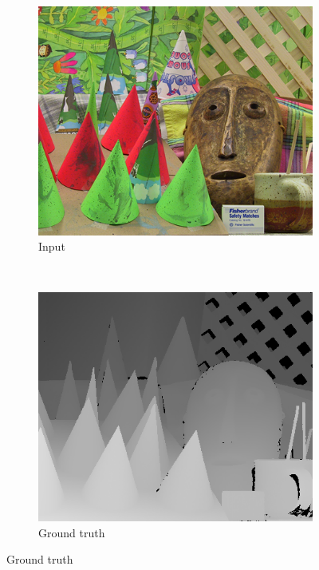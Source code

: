 \begin{figure}
  \setcounter{subfigure}{0}

  \label{fig:grid-of-outputs-cones}
  \centering

  \begin{subfigure}[b]{0.45\textwidth}
    \centering
    \includegraphics[width=\textwidth]{images/stereo-pairs/cones_imL.png}
    \caption{Input}
  \end{subfigure}
  ~
  \begin{subfigure}[b]{0.45\textwidth}
    \centering
    \includegraphics[width=\textwidth]{images/stereo-pairs/cones_groundtruth.png}
    \caption{Ground truth}
  \end{subfigure}


\end{figure}
